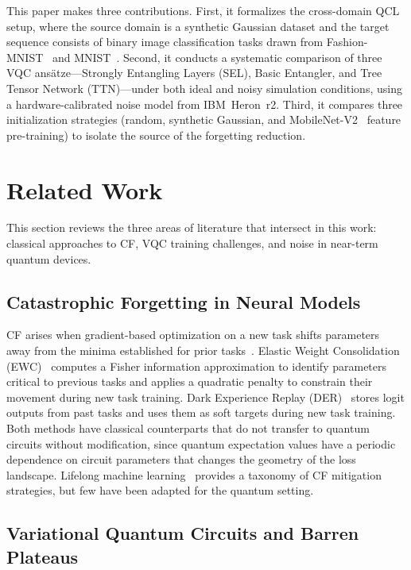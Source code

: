 \documentclass[10pt,conference]{IEEEtran}
\begin{document}
This paper makes three contributions. First, it formalizes the
cross-domain QCL setup, where the source domain is a synthetic
Gaussian dataset and the target sequence consists of binary image
classification tasks drawn from Fashion-MNIST~\cite{xiao2017fashion}
and MNIST~\cite{lecun1998gradient}. Second, it conducts a systematic
comparison of three VQC ans\"{a}tze---Strongly Entangling Layers
(SEL), Basic Entangler, and Tree Tensor Network (TTN)---under both
ideal and noisy simulation conditions, using a hardware-calibrated
noise model from IBM~Heron~r2. Third, it compares three
initialization strategies (random, synthetic Gaussian, and
MobileNet-V2~\cite{howard2017mobilenets} feature pre-training) to
isolate the source of the forgetting reduction.

\section{Related Work}

This section reviews the three areas of literature that intersect in
this work: classical approaches to CF, VQC training challenges, and
noise in near-term quantum devices.

\subsection{Catastrophic Forgetting in Neural Models}

CF arises when gradient-based optimization on a new task shifts
parameters away from the minima established for prior
tasks~\cite{parisi2019continual}. Elastic Weight Consolidation
(EWC)~\cite{kirkpatrick2017overcoming} computes a Fisher information
approximation to identify parameters critical to previous tasks and
applies a quadratic penalty to constrain their movement during new
task training. Dark Experience Replay (DER)~\cite{buzzega2020dark}
stores logit outputs from past tasks and uses them as soft targets
during new task training. Both methods have classical counterparts that
do not transfer to quantum circuits without modification, since quantum
expectation values have a periodic dependence on circuit parameters that
changes the geometry of the loss landscape. Lifelong machine
learning~\cite{chen2018catastrophic} provides a taxonomy of CF
mitigation strategies, but few have been adapted for the quantum
setting.

\subsection{Variational Quantum Circuits and Barren Plateaus}
\end{document}

